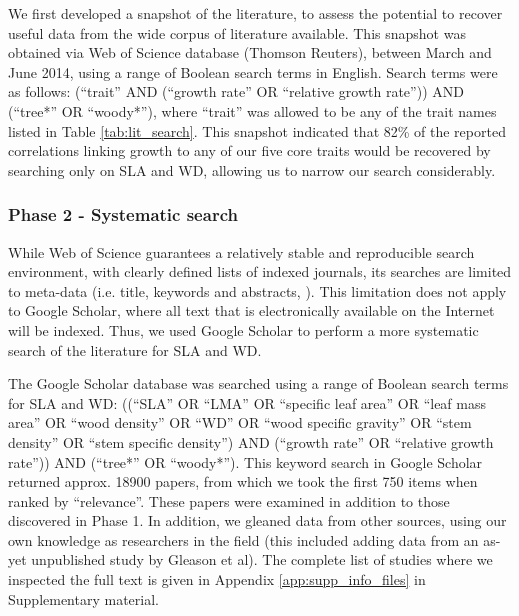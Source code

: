 \documentclass[a4paper,11pt]{article}
\begin{document}
We first developed a snapshot of the literature, to assess the potential to recover useful data from the wide corpus of literature available. This snapshot was obtained via Web of Science database (Thomson Reuters), between March and June 2014, using a range of Boolean search terms in English. Search terms were as follows: (``trait'' AND (``growth rate'' OR ``relative growth rate'')) AND (``tree*'' OR ``woody*''), where ``trait'' was allowed to be any of the trait names listed in Table \ref{tab:lit_search}. This snapshot indicated that 82\% of the reported correlations linking growth to any of our five core traits would be recovered by searching only on SLA and WD, allowing us to narrow our search considerably.

\subsubsection*{Phase 2 - Systematic search}\label{systematic-search}

While Web of Science guarantees a relatively stable and reproducible search environment, with clearly defined lists of indexed journals, its searches are limited to meta-data (i.e. title, keywords and abstracts, \citealt{Beckmann:2012hn}). This limitation does not apply to Google Scholar, where all text that is electronically available on the Internet will be indexed. Thus, we used Google Scholar to perform a more systematic search of the literature for SLA and WD.

The Google Scholar database was searched using a range of Boolean search terms for SLA and WD: ((``SLA'' OR ``LMA'' OR ``specific leaf area'' OR ``leaf mass area'' OR ``wood density'' OR ``WD'' OR ``wood specific gravity'' OR ``stem density'' OR ``stem specific density'') AND (``growth rate'' OR ``relative growth rate'')) AND (``tree*'' OR ``woody*''). This keyword search in Google Scholar returned approx. 18900 papers, from which we took the first 750 items when ranked by ``relevance''.
These papers were examined in addition to those discovered in Phase 1. In addition, we gleaned data from other sources, using our own knowledge as researchers in the field (this included adding data from an as-yet unpublished study by Gleason et al). The complete list of studies where we inspected the full text is given in Appendix \ref{app:supp_info_files} in Supplementary material.
\end{document}
